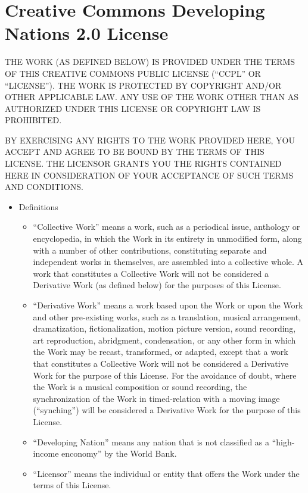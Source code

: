 \section{Creative Commons Developing Nations 2.0 License}

THE WORK (AS DEFINED BELOW) IS PROVIDED UNDER THE TERMS OF THIS
CREATIVE COMMONS PUBLIC LICENSE (``CCPL'' OR ``LICENSE'').  THE WORK
IS PROTECTED BY COPYRIGHT AND/OR OTHER APPLICABLE LAW.  ANY USE OF THE
WORK OTHER THAN AS AUTHORIZED UNDER THIS LICENSE OR COPYRIGHT LAW IS
PROHIBITED.

BY EXERCISING ANY RIGHTS TO THE WORK PROVIDED HERE, YOU ACCEPT AND
AGREE TO BE BOUND BY THE TERMS OF THIS LICENSE.  THE LICENSOR GRANTS
YOU THE RIGHTS CONTAINED HERE IN CONSIDERATION OF YOUR ACCEPTANCE OF
SUCH TERMS AND CONDITIONS.

\begin{itemize} \item Definitions

\begin{itemize} \item ``Collective Work'' means a work, such as a
periodical issue, anthology or encyclopedia, in which the Work in its
entirety in unmodified form, along with a number of other
contributions, constituting separate and independent works in
themselves, are assembled into a collective whole.  A work that
constitutes a Collective Work will not be considered a Derivative Work
(as defined below) for the purposes of this License.

\item ``Derivative Work'' means a work based upon the Work or upon the
Work and other pre-existing works, such as a translation, musical
arrangement, dramatization, fictionalization, motion picture version,
sound recording, art reproduction, abridgment, condensation, or any
other form in which the Work may be recast, transformed, or adapted,
except that a work that constitutes a Collective Work will not be
considered a Derivative Work for the purpose of this License.  For the
avoidance of doubt, where the Work is a musical composition or sound
recording, the synchronization of the Work in timed-relation with a
moving image (``synching'') will be considered a Derivative Work for
the purpose of this License.

\item ``Developing Nation'' means any nation that is not classified as
a ``high-income enconomy'' by the World Bank.

\item ``Licensor'' means the individual or entity that offers the Work
under the terms of this License.


\end{itemize}
\end{itemize}

